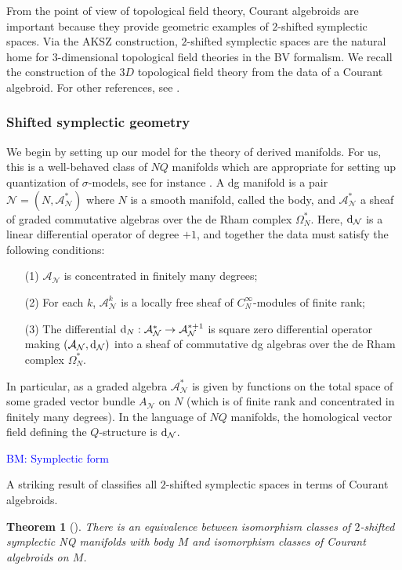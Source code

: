 \documentclass{article}
\newcommand{\cN}{\mathcal{N}}
\def\sA{\mathcal{A}}
\def\d{{\rm d}}
\newtheorem{theorem}{Theorem}[section]
\theoremstyle{definition}
\theoremstyle{remark}
\def\brian{\textcolor{blue}{BM: }\textcolor{blue}}
\begin{document}
From the point of view of topological field theory, Courant algebroids are important because they provide geometric examples of $2$-shifted symplectic spaces. 
Via the AKSZ construction, $2$-shifted symplectic spaces are the natural home for $3$-dimensional topological field theories in the BV formalism. 
We recall the construction of the $3D$ topological field theory from the data of a Courant algebroid. 
For other references, see \cite{Roytenberg:2002nu, Cattaneo:2009zx}. 

\subsubsection{Shifted symplectic geometry} 
\label{sec: dgman}

We begin by setting up our model for the theory of derived manifolds. 
For us, this is a well-behaved class of $NQ$ manifolds which are appropriate for setting up quantization of $\sigma$-models, see for instance \cite{CostelloSUSY}. 
A dg manifold is a pair $\cN = (N, \sA^*_\cN)$ where $N$ is a smooth manifold, called the body, and $\sA^*_\cN$ a sheaf of graded commutative algebras over the de Rham complex $\Omega^*_N$.
Here, $\d_\cN$ is a linear differential operator of degree $+1$, and together the data must satisfy the following conditions:
\begin{itemize}
\item[(1)] $\sA_\cN$ is concentrated in finitely many degrees;
\item[(2)] For each $k$, $\sA^k_\cN$ is a locally free sheaf of $C^\infty_N$-modules of finite rank;
\item[(3)] The differential $\d_N : \sA_\cN^* \to \sA_\cN^{*+1}$ is square zero differential operator making $(\sA_\cN , \d_\cN)$ into a sheaf of commutative dg algebras over the de Rham complex $\Omega^*_N$.
\end{itemize}

In particular, as a graded algebra $\sA^*_\cN$ is given by functions on the total space of some graded vector bundle $A_\cN$ on $N$ (which is of finite rank and concentrated in finitely many degrees). 
In the language of $NQ$ manifolds, the homological vector field defining the $Q$-structure is $\d_\cN$. 

\brian{Symplectic form}

A striking result of \cite{Roytenberg:2002nu} classifies all $2$-shifted symplectic spaces in terms of Courant algebroids. 

\begin{theorem}[\cite{Roytenberg:2002nu}]
There is an equivalence between isomorphism classes of $2$-shifted symplectic NQ manifolds with body $M$ and isomorphism classes of Courant algebroids on $M$.
\end{theorem}
\end{document}
